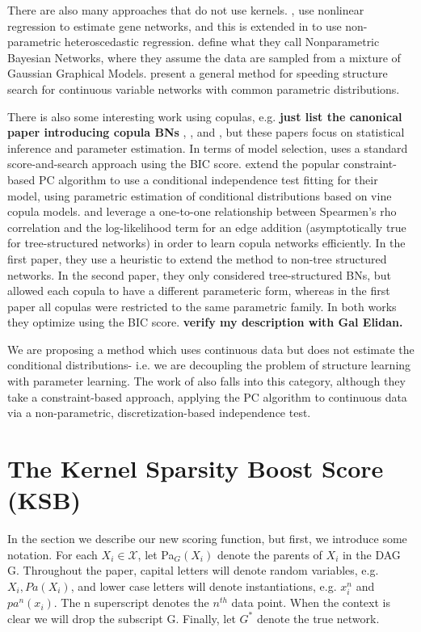 \documentclass{article} %
\begin{document}
There are also many approaches that do not use kernels.  \cite{imoto2001estimation}, use nonlinear regression to estimate gene networks, and this is extended in \cite{imoto2003bayesian} to use non-parametric heteroscedastic regression.  \cite{ickstadt2010nonparametric} define what they call Nonparametric Bayesian Networks, where they assume the data are sampled from a mixture of Gaussian Graphical Models. \cite{elidan2007ideal} present a general method for speeding structure search for continuous variable networks with common parametric distributions. 

There is also some interesting work using copulas, e.g. {\bf just list the canonical paper introducing copula BNs}  \cite{hanea2006hybrid}, \cite{hanea2008mixed}, and \cite{hanea2010mining}, but these papers focus on statistical inference and parameter estimation.  In terms of model selection, \cite{elidan2010copula} uses a standard score-and-search approach using the BIC score.  \cite{bauer2012pair} extend the popular constraint-based PC algorithm to use a conditional independence test fitting for their model, using parametric estimation of conditional distributions based on vine copula models.  \cite{elidan2012lightning} and \cite{tenzer2013speedy} leverage a one-to-one relationship between Spearmen's rho correlation and the log-likelihood term for an edge addition (asymptotically true for tree-structured networks) in order to learn copula networks efficiently.  In the first paper, they use a heuristic to extend the method to non-tree structured networks.  In the second paper, they only considered tree-structured BNs, but allowed each copula to have a different parameteric form, whereas in the first paper all copulas were restricted to the same parametric family.  In both works they optimize using the BIC score. {\bf verify my description with Gal Elidan.}

We are proposing a method which uses continuous data but does not estimate the conditional distributions- i.e. we are decoupling the problem of structure learning with parameter learning.  The work of \cite{margaritis2005distribution} also falls into this category, although they take a constraint-based approach, applying the PC algorithm to continuous data via a non-parametric, discretization-based independence test.

\section{The Kernel Sparsity Boost Score (KSB)}
In the section we describe our new scoring function, but first, we introduce some notation.  For each $X_i \in \mathcal{X}$, let Pa$_G(X_i)$ denote the parents of $X_i$ in the DAG G.   Throughout the paper, capital letters will denote random variables, e.g. $X_i, Pa(X_i)$, and lower case letters will denote instantiations, e.g. $x_i^n$ and $pa^n(x_i)$.  The n superscript denotes the $n^{th}$ data point.   When the context is clear we will drop the subscript G.  Finally, let $G^*$ denote the true network.
\end{document}
